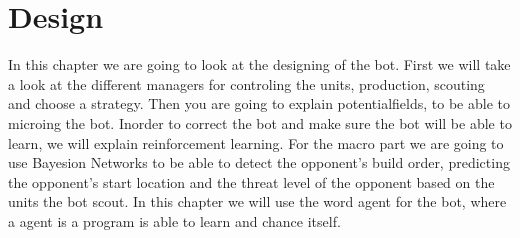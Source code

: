 \chapter{Design}\label{design}
	In this chapter we are going to look at the designing of the bot. First we will take a look at the different managers for controling the units, production,
	scouting and choose a strategy. Then you are going to explain potentialfields, to be able to microing the bot. Inorder to correct the bot and make
	sure the bot will be able to learn, we will explain reinforcement learning. For the macro part we are going to use Bayesion Networks to be able to
	detect the opponent's build order, predicting the opponent's start location and the threat level of the opponent based on the units the bot scout. In
	this chapter we will use the word agent for the bot, where a agent is a program is able to learn and chance itself.
	
	
	
	
	
	
	
	
	
